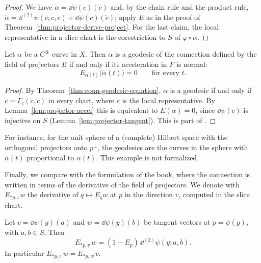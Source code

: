 \begin{proof}
  \leanok
  We have $\dot\alpha = \dd\psi(c)(\dot c)$ and, by the chain rule and the product rule,
  $\ddot\alpha = \dd^{(2)}\psi(c; \dot c, \dot c) + \dd\psi(c)(\ddot c)$; apply $E$ as in
  the proof of Theorem~\ref{thm:projector-derive-project}. For the last claim, the local
  representative in a slice chart is the corestriction to $S$ of $\varphi \circ \alpha$.
\end{proof}

\begin{theorem}
  \label{thm:projector-geodesics}
  \leanok
  Let $\alpha$ be a $C^{2}$ curve in $X$. Then $\alpha$ is a geodesic of the connection defined
  by the field of projectors $E$ if and only if its acceleration in $F$ is normal:
  \[
    E_{\alpha(t)}\bigl(\ddot\alpha(t)\bigr) = 0 \qquad \text{for every } t.
  \]
\end{theorem}

\begin{proof}
  \leanok
  By Theorem~\ref{thm:conn-geodesic-equation}, $\alpha$ is a geodesic if and only if
  $\ddot c = \Gamma_c(\dot c, \dot c)$ in every chart, where $c$ is the local representative. By
  Lemma~\ref{lem:projector-accel} this is equivalent to $E(\ddot\alpha) = 0$, since $\dd\psi(c)$ is
  injective on $S$ (Lemma~\ref{lem:projector-tangent}). This is part of \cite[Teorema~6.6.1]{Lar22}.
\end{proof}

For instance, for the unit sphere of a (complete) Hilbert space with the orthogonal projectors
onto $p^\perp$, the geodesics are the curves in the sphere with $\ddot\alpha(t)$ proportional to
$\alpha(t)$. This example is not formalized.

Finally, we compare with the formulation of the book, where the connection is written in terms of
the derivative of the field of projectors. We denote with $E_{*p, v} w$ the derivative of
$q \mapsto E_q w$ at $p$ in the direction $v$, computed in the slice chart.

\begin{proposition}
  \label{prop:projector-book-identity}
  \leanok
  Let $v = \dd\psi(y)(a)$ and $w = \dd\psi(y)(b)$ be tangent vectors at $p = \psi(y)$, with
  $a, b \in S$. Then
  \[
    E_{*p, v}\, w = (1 - E_p)\, \dd^{(2)}\psi(y; a, b).
  \]
  In particular $E_{*p, v}\, w = E_{*p, w}\, v$.
\end{proposition}

